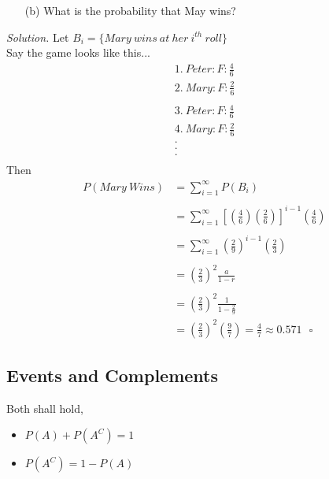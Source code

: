\documentclass[12pt]{book}
\begin{document}
\begin{itemize}\item [(b)] What is the probability that May wins?\end{itemize}
\textit{Solution.}
Let $B_i=\{Mary~wins~at~her~i^{th}~roll\}$\\
Say the game looks like this...\\
$$\begin{aligned}
1.~Peter : F : \frac{4}{6}\\
2.~Mary : F : \frac{2}{6}\\
\end{aligned} $$
$$\begin{aligned}
3.~Peter : F : \frac{4}{6}\\
4.~Mary : F : \frac{2}{6}\\
.\\
.\\
.\\
\end{aligned} $$
Then 
$$
\begin{aligned}
P(Mary~Wins)&=\sum\limits_{i=1}^{\infty} P(B_{i})\\\\
&= \sum\limits_{i=1}^{\infty} \left[ \left(\frac{4}{6}\right) \left(\frac{2}{6}\right) \right]^{i-1} \left(\frac{4}{6}\right)\\\\
&=\sum\limits_{i=1}^{\infty} \left(\frac{2}{9}\right)^{i-1} \left(\frac{2}{3}\right)\\\\
&= \left(\frac{2}{3}\right)^{2} \frac{a}{1-r}\\\\
&=\left(\frac{2}{3}\right)^{2} \frac{1}{1-\frac{2}{9}}\\
&=\left(\frac{2}{3}\right)^{2} \left(\frac{9}{7}\right) = \frac{4}{7} \approx 0.571~~~\square
\end{aligned}
$$




\newpage
\subsection{Events and Complements}
Both shall hold, 
\begin{itemize}
\item $P(A)+P(A^C)=1$
\item $P(A^C)=1-P(A)$
\end{itemize}
\end{document}
